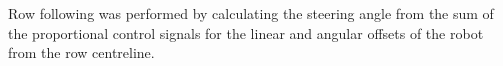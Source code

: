 \documentclass[preprint,authoryear,12pt]{elsarticle}
\begin{document}
        Row following was performed by calculating the steering angle from the sum of the proportional control signals for the linear and angular offsets of the robot from the row centreline.

\end{document}
